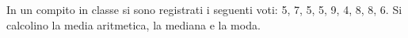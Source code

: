 In un compito in classe si sono registrati i seguenti voti:
5, 7, 5, 5, 9, 4, 8, 8, 6.
Si calcolino la media aritmetica, la mediana e la moda.